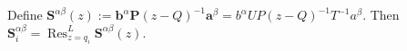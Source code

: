 \documentclass[11pt]{report}
\theoremstyle{definition}
\theoremstyle{remark}
\theoremstyle{remark}
\begin{document}
Define $\mathbf{S}^{\alpha\beta}(z) := \mathbf{b}^\alpha \mathbf{P} (z-Q)^{-1} \mathbf{a}^\beta = b^\alpha U P (z-Q)^{-1} T^{-1} a^\beta$. Then $\mathbf{S}_i^{\alpha\beta} = \operatorname{Res}_{z=q_i}^L \mathbf{S}^{\alpha\beta}(z)$.
\end{document}
